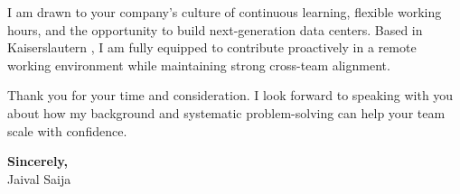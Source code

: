 \documentclass[11pt,a4paper]{article}
\begin{document}
I am drawn to your company's culture of continuous learning, flexible working hours, and the opportunity to build next-generation data centers. Based in Kaiserslautern , I am fully equipped to contribute proactively in a remote working environment while maintaining strong cross-team alignment.

Thank you for your time and consideration. I look forward to speaking with you about how my background and systematic problem-solving can help your team scale with confidence.


\textbf{Sincerely,} \\
Jaival Saija
\end{document}
